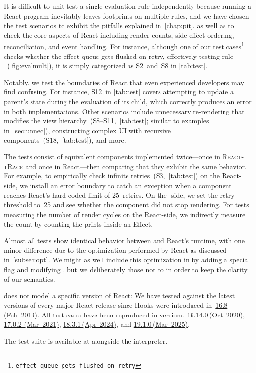 It is difficult to unit test a single evaluation rule independently because running a React program inevitably leaves footprints on multiple rules, and we have chosen the test scenarios to exhibit the pitfalls explained in~\cref{chap:pit}, as well as to check the core aspects of React including render counts, side effect ordering, reconciliation, and event handling.
For instance, although one of our test cases\footnote{\texttt{effect\_queue\_gets\_flushed\_on\_retry}} checks whether the effect queue gets flushed on retry, effectively testing rule ~(\cref{fig:evalmult}), it is simply categorized as S2~and~S8 in \cref{tab:test}.

Notably, we test the boundaries of React that even experienced developers may find confusing.
For instance, S12~in \cref{tab:test} covers attempting to update a parent's state during the evaluation of its child, which correctly produces an error in both implementations.
Other scenarios include unnecessary re-rendering that modifies the view hierarchy~(S8--S11,~\cref{tab:test}; similar to examples in~\cref{sec:unnec}), constructing complex UI with recursive components~(S18,~\cref{tab:test}), and more.

The tests consist of equivalent components implemented twice---once in \textsc{\textsf{React\--tRace}} and once in React---then comparing that they exhibit the same behavior.
For example, to empirically check infinite retries~(S3,~\cref{tab:test}) on the React-side, we install an error boundary \citep{Met25Component} to catch an exception when a component reaches React's hard-coded limit of 25~retries.
On the \Rtrace{}-side, we set the retry threshold to~25 and see whether the component did not stop rendering.
For tests measuring the number of render cycles on the React-side, we indirectly measure the count by counting the prints inside an Effect.

Almost all tests show identical behavior between \Rtrace{} and React's runtime, with one minor difference due to the optimization performed by React as discussed in~\cref{subsec:opt}.
We might as well include this optimization in \Rtrace{} by adding a special flag and modifying , but we deliberately chose not to in order to keep the clarity of our semantics.

\Rtrace{} does not model a specific version of React: We have tested against the latest versions of every major React release since Hooks were introduced in~\href{https://www.npmjs.com/package/react/v/16.8.0}{16.8 (Feb~2019)}.  %
All test cases have been reproduced in versions~\href{https://www.npmjs.com/package/react/v/16.14.0}{16.14.0\,(Oct~2020)}, \href{https://www.npmjs.com/package/react/v/17.0.2}{17.0.2 (Mar~2021)}, \href{https://www.npmjs.com/package/react/v/18.3.1}{18.3.1\,(Apr~2024)}, and \href{https://www.npmjs.com/package/react/v/19.1.0}{19.1.0\,(Mar~2025)}.

The test suite is available at \href{https://github.com/Zeta611/react-trace}{} alongside the \Rtrace{} interpreter.
